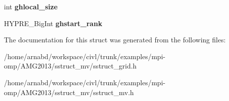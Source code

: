 \begin{DoxyCompactItemize}
\item 
\hypertarget{structhypre__SStructGrid__struct_a2423e1319716a2f78c06cc21558dc46f}{}int {\bfseries ghlocal\+\_\+size}\label{structhypre__SStructGrid__struct_a2423e1319716a2f78c06cc21558dc46f}

\item 
\hypertarget{structhypre__SStructGrid__struct_adb835b2f89ac0f80daf9ca4cc68d2f4e}{}H\+Y\+P\+R\+E\+\_\+\+Big\+Int {\bfseries ghstart\+\_\+rank}\label{structhypre__SStructGrid__struct_adb835b2f89ac0f80daf9ca4cc68d2f4e}

\end{DoxyCompactItemize}


The documentation for this struct was generated from the following files\+:\begin{DoxyCompactItemize}
\item 
/home/arnabd/workspace/civl/trunk/examples/mpi-\/omp/\+A\+M\+G2013/sstruct\+\_\+mv/sstruct\+\_\+grid.\+h\item 
/home/arnabd/workspace/civl/trunk/examples/mpi-\/omp/\+A\+M\+G2013/sstruct\+\_\+mv/sstruct\+\_\+mv.\+h\end{DoxyCompactItemize}
